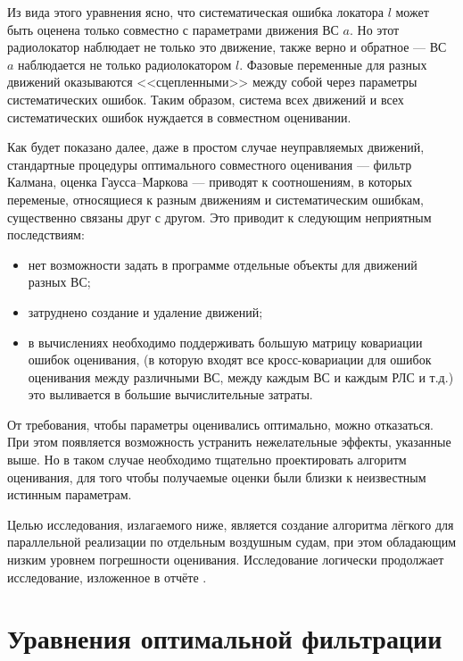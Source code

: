 Из вида этого уравнения ясно, что систематическая ошибка локатора $l$ может быть 
оценена только совместно с параметрами движения ВС $a$. 
Но этот радиолокатор наблюдает не только это движение, 
также верно и обратное --- ВС $a$ наблюдается не только радиолокатором $l$. 
Фазовые переменные для разных движений оказываются <<сцепленными>> между собой 
через параметры систематических ошибок. 
Таким образом, система всех движений и всех систематических ошибок нуждается в совместном оценивании. 

Как будет показано далее, даже в простом случае неуправляемых движений, 
стандартные процедуры оптимального совместного оценивания --- 
фильтр Калмана, оценка Гаусса--Маркова --- приводят к соотношениям, 
в которых переменые, относящиеся к разным движениям и систематическим ошибкам, 
существенно связаны друг с другом. 
Это приводит к следующим неприятным последствиям: 
\begin{itemize}
  \item 
  нет возможности задать в программе отдельные объекты для движений разных ВС;
  \item
  затруднено создание и удаление движений;
  \item
  в вычислениях необходимо поддерживать большую матрицу ковариации ошибок оценивания, 
  (в которую входят все кросс-ковариации для ошибок оценивания между различными ВС, 
  между каждым ВС и каждым РЛС и т.д.) это выливается в большие вычислительные затраты. 
\end{itemize}
От требования, чтобы параметры оценивались оптимально, можно отказаться. 
При этом появляется возможность устранить нежелательные эффекты, указанные выше. 
Но в таком случае необходимо тщательно проектировать алгоритм оценивания, 
для того чтобы получаемые оценки были близки к неизвестным истинным параметрам. 

Целью исследования, излагаемого ниже, является создание алгоритма 
лёгкого для параллельной реализации по отдельным воздушным судам, 
при этом обладающим низким уровнем погрешности оценивания. 
Исследование логически продолжает исследование, изложенное в отчёте \cite{otch201505}. 

\section{Уравнения оптимальной фильтрации}

